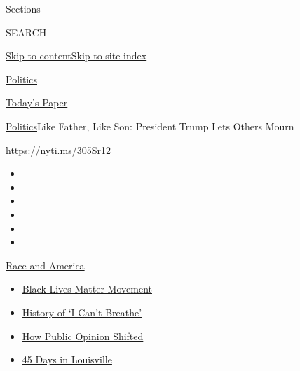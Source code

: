 Sections

SEARCH

\protect\hyperlink{site-content}{Skip to
content}\protect\hyperlink{site-index}{Skip to site index}

\href{https://www.nytimes.com/section/politics}{Politics}

\href{https://myaccount.nytimes.com/auth/login?response_type=cookie\&client_id=vi}{}

\href{https://www.nytimes.com/section/todayspaper}{Today's Paper}

\href{/section/politics}{Politics}\textbar{}Like Father, Like Son:
President Trump Lets Others Mourn

\url{https://nyti.ms/305Sr12}

\begin{itemize}
\item
\item
\item
\item
\item
\item
\end{itemize}

\href{https://www.nytimes.com/news-event/george-floyd-protests-minneapolis-new-york-los-angeles?action=click\&pgtype=Article\&state=default\&region=TOP_BANNER\&context=storylines_menu}{Race
and America}

\begin{itemize}
\tightlist
\item
  \href{https://www.nytimes.com/interactive/2020/07/03/us/george-floyd-protests-crowd-size.html?action=click\&pgtype=Article\&state=default\&region=TOP_BANNER\&context=storylines_menu}{Black
  Lives Matter Movement}
\item
  \href{https://www.nytimes.com/interactive/2020/06/28/us/i-cant-breathe-police-arrest.html?action=click\&pgtype=Article\&state=default\&region=TOP_BANNER\&context=storylines_menu}{History
  of `I Can't Breathe'}
\item
  \href{https://www.nytimes.com/interactive/2020/06/10/upshot/black-lives-matter-attitudes.html?action=click\&pgtype=Article\&state=default\&region=TOP_BANNER\&context=storylines_menu}{How
  Public Opinion Shifted}
\item
  \href{https://www.nytimes.com/interactive/2020/07/16/us/black-lives-matter-protests-louisville-breonna-taylor.html?action=click\&pgtype=Article\&state=default\&region=TOP_BANNER\&context=storylines_menu}{45
  Days in Louisville}
\end{itemize}

